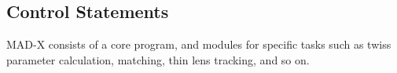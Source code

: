 





%
%
%
%


\subsection{Control Statements}

 MAD-X consists of a core program, and modules for specific tasks such as twiss parameter calculation, matching, thin lens tracking, and so on. 

